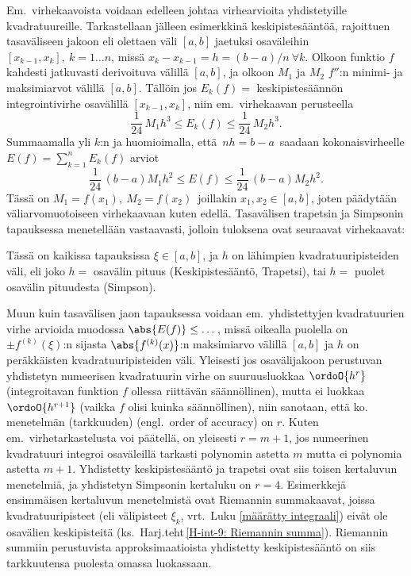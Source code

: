 Em.\ virhekaavoista voidaan edelleen johtaa virhearvioita yhdistetyille kvadratuureille.
Tarkastellaan jälleen esimerkkinä keskipistesääntöä, rajoittuen tasaväliseen jakoon eli
olettaen väli $[a,b]$ jaetuksi osaväleihin $[x_{k-1},x_k],\ k=1\ldots n$, missä
$x_k-x_{k-1}=h=(b-a)/n\ \forall k$. Olkoon funktio $f$ kahdesti jatkuvasti
derivoituva välillä $[a,b]$, ja olkoon $M_1$ ja $M_2$ $f''$:n minimi- ja maksimiarvot välillä
$[a,b]$. Tällöin jos $E_k(f) =$ keskipistesäännön integrointivirhe osavälillä $[x_{k-1},x_k]$,
niin em.\ virhekaavan perusteella
\[ 
\frac{1}{24}\,M_1 h^3 \le E_k(f) \le \frac{1}{24}\,M_2 h^3. 
\]
Summaamalla yli $k$:n ja huomioimalla, että $\,nh=b-a\,$ saadaan kokonaisvirheelle 
$E(f) = \sum_{k=1}^n E_k(f)$ arviot
\[ 
\frac{1}{24}\,(b-a)M_1 h^2 \le E(f) \le \frac{1}{24}\,(b-a)M_2 h^2. 
\]
Tässä on $M_1=f(x_1),\ M_2=f(x_2)\,$ joillakin $x_1,x_2 \in [a,b]$, joten päädytään 
väliarvomuotoiseen virhekaavaan kuten edellä. Tasavälisen trapetsin ja Simpsonin tapauksessa
menetellään vastaavasti, jolloin tuloksena ovat seuraavat virhekaavat:
\begin{center}
\end{center}
Tässä on kaikissa tapauksissa $\xi \in [a,b]$, ja $h$ on lähimpien kvadratuuripisteiden väli,
eli joko $h=$ osavälin pituus (Keskipistesääntö, Trapetsi), tai $h=$ puolet osavälin
pituudesta (Simpson).

Muun kuin tasavälisen jaon tapauksessa voidaan em.\ yhdistettyjen kvadratuurien virhe arvioida
muodossa $\abs{E(f)} \le \ldots\,$, missä oikealla puolella on $\pm f^{(k)}(\xi)$:n sijasta
$\abs{f^{(k)}(x)}$:n maksimiarvo välillä $[a,b]$ ja $h$ on peräkkäisten kvadratuuripisteiden
 väli. Yleisesti jos osavälijakoon perustuvan yhdistetyn numeerisen kvadratuurin
virhe on suuruusluokkaa $\ordoO{h^r}$ (integroitavan funktion $f$ ollessa riittävän
säännöllinen), mutta ei luokkaa $\ordoO{h^{r+1}}$ (vaikka $f$ olisi kuinka säännöllinen), niin
sanotaan, että ko. menetelmän (tarkkuuden)
%
 (engl.\ order of accuracy) on $r$.
Kuten em.\ virhetarkastelusta voi päätellä, on yleisesti $r=m+1$, jos numeerinen kvadratuuri
integroi osaväleillä tarkasti polynomin astetta $m$ mutta ei polynomia astetta $m+1$.
Yhdistetty keskipistesääntö ja trapetsi ovat siis toisen kertaluvun menetelmiä, ja yhdistetyn
Simpsonin kertaluku on $r=4$. Esimerkkejä ensimmäisen kertaluvun menetelmistä ovat Riemannin
summakaavat, joissa kvadratuuripisteet (eli välipisteet $\xi_k$, vrt.\ Luku
\ref{määrätty integraali}) eivät ole osavälien keskipisteitä
(ks.\ Harj.teht\,\ref{H-int-9: Riemannin summa}). Riemannin summiin perustuvista
approksimaatioista yhdistetty keskipistesääntö on siis tarkkuutensa puolesta omassa luokassaan.

